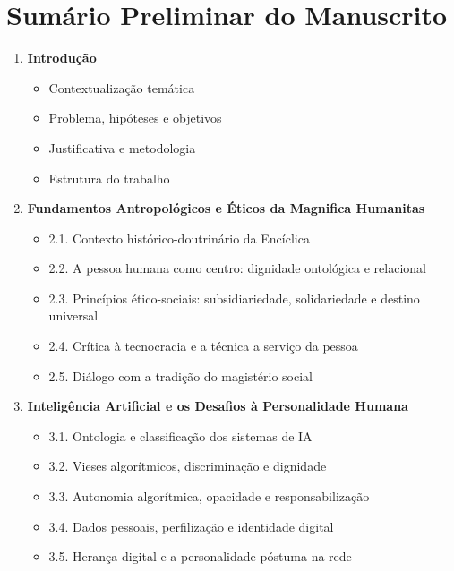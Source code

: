 \documentclass[12pt,a4paper]{article}
\begin{document}
\section{Sumário Preliminar do Manuscrito}

\begin{enumerate}[label=CAPÍTULO \arabic*:]
\item \textbf{Introdução}
    \begin{itemize}
    \item Contextualização temática
    \item Problema, hipóteses e objetivos
    \item Justificativa e metodologia
    \item Estrutura do trabalho
    \end{itemize}

\item \textbf{Fundamentos Antropológicos e Éticos da Magnifica Humanitas}
    \begin{itemize}
    \item 2.1. Contexto histórico-doutrinário da Encíclica
    \item 2.2. A pessoa humana como centro: dignidade ontológica e relacional
    \item 2.3. Princípios ético-sociais: subsidiariedade, solidariedade e destino universal
    \item 2.4. Crítica à tecnocracia e a técnica a serviço da pessoa
    \item 2.5. Diálogo com a tradição do magistério social
    \end{itemize}

\item \textbf{Inteligência Artificial e os Desafios à Personalidade Humana}
    \begin{itemize}
    \item 3.1. Ontologia e classificação dos sistemas de IA
    \item 3.2. Vieses algorítmicos, discriminação e dignidade
    \item 3.3. Autonomia algorítmica, opacidade e responsabilização
    \item 3.4. Dados pessoais, perfilização e identidade digital
    \item 3.5. Herança digital e a personalidade póstuma na rede
    \end{itemize}


\end{enumerate}
\end{document}
